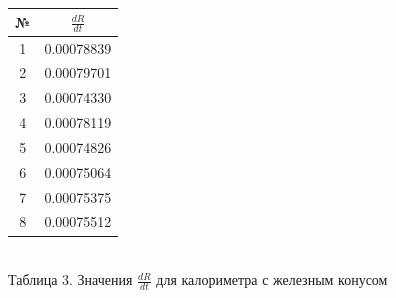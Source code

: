 \documentclass[a4paper, 12pt]{article}
\begin{document}
\begin{center}
	\begin{tabular} {|c | c |}
		\hline	
		№ & $\frac{dR}{dt}$ \\
		\hline
		1 & 0.00078839 \\
		\hline
		2 & 0.00079701 \\
		\hline
		3 & 0.00074330 \\
		\hline
		4 & 0.00078119 \\
		\hline
		5 & 0.00074826 \\
		\hline
		6 & 0.00075064 \\
		\hline
		7 & 0.00075375 \\
		\hline
		8 & 0.00075512 \\
		\hline
	\end{tabular}\\
	Таблица 3. Значения $\frac{dR}{dt}$ для калориметра с железным конусом
\end{center}
\end{document}
